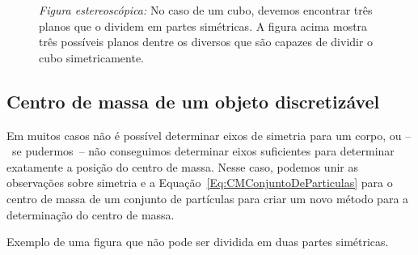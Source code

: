 \begin{figure}
\begin{minipage}[c]{0.48\linewidth}
\end{minipage}
\caption{\emph{Figura estereoscópica:} No caso de um cubo, devemos encontrar três planos que o dividem em partes simétricas. A figura acima mostra três possíveis planos dentre os diversos que são capazes de dividir o cubo simetricamente. \label{Fig:CMCubo}}
\end{figure}

\subsection{Centro de massa de um objeto discretizável}

Em muitos casos não é possível determinar eixos de simetria para um corpo, ou --~se pudermos~-- não conseguimos determinar eixos suficientes para determinar exatamente a posição do centro de massa. Nesse caso, podemos unir as observações sobre simetria e a Equação~\ref{Eq:CMConjuntoDeParticulas} para o centro de massa de um conjunto de partículas para criar um novo método para a determinação do centro de massa.

\begin{marginfigure}
\centering
{}
\caption{Exemplo de uma figura que não pode ser dividida em duas partes simétricas. \label{Fig:PlacaAssimetrica}}
\end{marginfigure}

